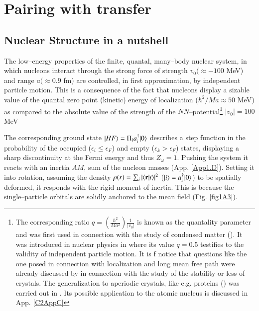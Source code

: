 \chapter{Pairing with transfer}\label{chapter1}
\section{Nuclear Structure in a nutshell}\label{C1S1}
The low--energy properties of the finite, quantal, many--body nuclear system, in which nucleons interact through the strong force of strength $v_0(\approx -100$ MeV) and range $a(\approx 0.9$ fm) are controlled, in first approximation, by independent particle motion. This is a consequence of the fact that nucleons display a sizable value of the quantal zero point (kinetic) energy of localization ($\hbar^2/Ma\approx 50$ MeV) as compared to the absolute value of the strength of the $NN$--potential\footnote{The corresponding ratio $q=\left(\frac{\hbar^2}{Ma^2}\right)\frac{1}{|v_0|}$ is known as the quantality parameter and was first used in connection with the study of condensed matter (\cite{deBoer:48,deBoer:57,deBoer:48b,Nosanow:76}). It  was introduced in nuclear physics in \cite{Mottelson:02} where its value $q=0.5$ testifies to the validity of independent particle motion. It is f notice that questions like the one posed in connection with localization and long mean free path were already discussed by \cite{Lindemann:10} in connection with the study of the stability or less of crystals. The generalization to aperiodic crystals, like e.g. proteins (\cite{Schrodinger:44}) was carried out in \cite{Stillinger:90}. Its possible application to the atomic nucleus is discussed in App. \ref{C2AppC} } $|v_0|=100$ MeV 

The corresponding ground state $|{HF} \rangle=\Pi_ia^\dagger_i|{0} \rangle$ describes a step function in the probability of the occupied ($\epsilon_i\leq \epsilon_F$) and empty ($\epsilon_k>\epsilon_F$) states, displaying a sharp discontinuity at the Fermi energy and thus $Z_\omega=1$. Pushing the system it reacts with an inertia $AM$, sum of the nucleon masses (App. \ref{App1.D}). Setting it into rotation, assuming the density $\rho(r)=\sum_i|\langle {\mathbf r|i} \rangle|^2$ ($|{i} \rangle=a^\dagger_i|{0} \rangle$) to be spatially deformed, it responds with the rigid moment of inertia. This is because the single--particle orbitals are solidly anchored to the mean field (Fig. \ref{fig1A3}).


